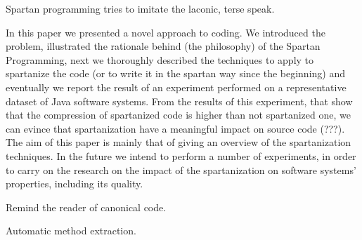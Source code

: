 Spartan programming tries to imitate the laconic, terse speak.  

In this paper we presented a novel approach to coding. We introduced the
problem, illustrated the rationale behind (the philosophy) of the Spartan
Programming, next we thoroughly described the techniques to apply to spartanize
the code (or to write it in the spartan way since the beginning) and eventually
we report the result of an experiment performed on a representative dataset of
Java software systems.  From the results of this experiment, that show that the
compression of spartanized code is higher than not spartanized one, we can
evince that spartanization have a meaningful impact on source code (???).  The
aim of this paper is mainly that of giving an overview of the spartanization
techniques.  In the future we intend to perform a number of experiments, in
order to carry on the research on the impact of the spartanization on software
systems' properties, including its quality.

Remind the reader of canonical code.

Automatic method extraction.
